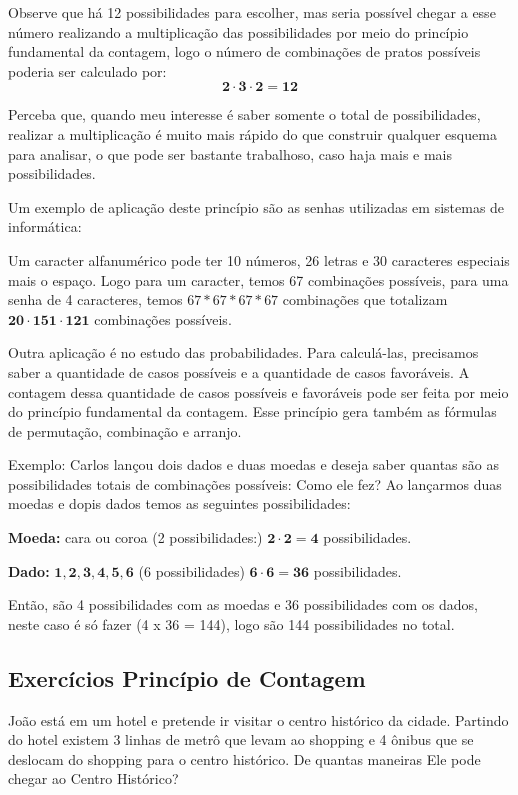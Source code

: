 \begin{multicols*}{2}
	Observe que há 12 possibilidades para escolher, mas seria possível chegar a esse número realizando a multiplicação das possibilidades por meio do princípio fundamental da contagem, logo o número de combinações de pratos possíveis poderia ser calculado por:
	\[ \mathbf{2 \cdot 3 \cdot 2 = 12 } \]

	Perceba que, quando meu interesse é saber somente o total de possibilidades, realizar a multiplicação é muito mais rápido do que construir qualquer esquema para analisar, o que pode ser bastante trabalhoso, caso haja mais e mais possibilidades.

	Um exemplo de aplicação deste princípio são as senhas utilizadas em sistemas de informática:

	Um caracter alfanumérico pode ter 10 números, 26 letras e 30 caracteres especiais mais o espaço. Logo para um caracter, temos 67 combinações possíveis, para uma senha de 4 caracteres, temos {$ 67 * 67 * 67 * 67 $ } combinações que totalizam  {$ \mathbf{20 \cdot 151 \cdot 121 }$} combinações possíveis.

	Outra aplicação é no estudo das probabilidades. Para calculá-las, precisamos saber a quantidade de casos possíveis e a quantidade de casos favoráveis. A contagem dessa quantidade de casos possíveis e favoráveis pode ser feita por meio do princípio fundamental da contagem. Esse princípio gera também as fórmulas de permutação, combinação e arranjo.

	Exemplo: Carlos lançou dois dados e duas moedas e deseja saber quantas são as possibilidades totais de combinações possíveis: Como ele fez?
	Ao lançarmos duas moedas e dopis dados temos as seguintes possibilidades:

	\textbf{Moeda:} cara ou coroa (2 possibilidades:)  {$ \mathbf{ 2 \cdot 2 = 4 }$} possibilidades.

	\textbf{Dado:} {$ \mathbf{1, 2, 3, 4, 5, 6}$} (6 possibilidades) {$ \mathbf{ 6 \cdot 6 = 36 }$} possibilidades.

	Então, são 4 possibilidades com as moedas e 36 possibilidades com os dados, neste caso é só fazer (4 x 36 = 144), logo são 144 possibilidades no total.

	\subsection*{Exercícios Princípio de Contagem}

	\setcounter{numexercicio}{0}
	\execnum João está em um hotel e pretende ir visitar o centro histórico da cidade. Partindo do hotel existem 3 linhas de metrô que levam ao shopping e 4 ônibus que se deslocam do shopping para o centro histórico. De quantas maneiras Ele pode chegar ao Centro Histórico?


\end{multicols*}
